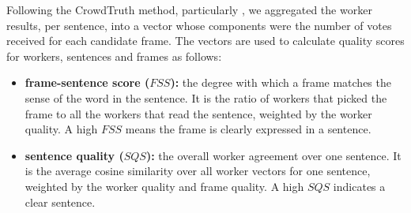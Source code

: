 Following the CrowdTruth method, particularly \cite{dumitrache2015b}, we aggregated the worker results, per sentence, into a vector whose components were the number of votes received for each candidate frame. The vectors are used to calculate quality scores for workers, sentences and frames as follows:


\begin{itemize}%

\item \textbf{frame-sentence score ($FSS$):} the degree with which a frame matches the sense of the word in the sentence. It is the ratio of workers that picked the frame to all the workers that read the sentence, weighted by the worker quality.  A high $FSS$ means the frame is clearly expressed in a sentence.
\item \textbf{sentence quality ($SQS$):} the overall worker agreement over one sentence. It is the average cosine similarity over all worker vectors for one sentence, weighted by the worker quality and frame quality. A high $SQS$ indicates a clear sentence.

\end{itemize}

